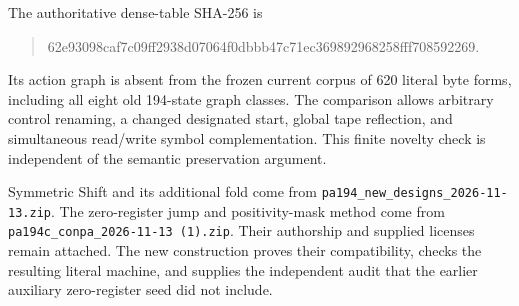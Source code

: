 The authoritative dense-table SHA-256 is
\begin{quote}\ttfamily\small
62e93098caf7c09ff2938d07064f0dbbb47c71ec369892968258fff708592269.
\end{quote}
Its action graph is absent from the frozen current corpus of 620 literal
byte forms, including all eight old 194-state graph classes. The comparison
allows arbitrary control renaming, a changed designated start, global tape
reflection, and simultaneous read/write symbol complementation. This finite
novelty check is independent of the semantic preservation argument.

Symmetric Shift and its additional fold come from
\texttt{pa194\_new\_designs\_2026-11-13.zip}. The zero-register jump and
positivity-mask method come from
\texttt{pa194c\_conpa\_2026-11-13 (1).zip}. Their authorship and supplied
licenses remain attached. The new construction proves their compatibility,
checks the resulting literal machine, and supplies the independent audit
that the earlier auxiliary zero-register seed did not include.
